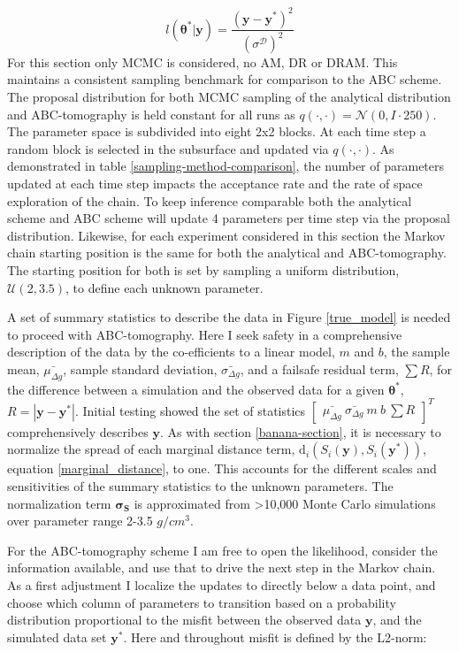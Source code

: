 \begin{equation}
	l(\bm{\theta^*}|\bm{y}) = \frac{(\bm{y}-\bm{y^*})^2}{(\sigma^{\mathcal{D}})^2}
\end{equation}
For this section only MCMC is considered, no AM, DR or DRAM. This maintains a consistent sampling benchmark for comparison to the ABC scheme. The proposal distribution for both MCMC sampling of the analytical distribution and ABC-tomography is held constant for all runs as $q(\cdot,\cdot) = \mathcal{N}(0,I\cdot250)$. The parameter space is subdivided into eight 2x2 blocks. At each time step a random block is selected in the subsurface and updated via $q(\cdot,\cdot)$. As demonstrated in table \ref{sampling-method-comparison}, the number of parameters updated at each time step impacts the acceptance rate and the rate of space exploration of the chain. To keep inference comparable both the analytical scheme and ABC scheme will update 4 parameters per time step via the proposal distribution. Likewise, for each experiment considered in this section the Markov chain starting position is the same for both the analytical and ABC-tomography. The starting position for both is set by sampling a uniform distribution, $\mathcal{U}(2,3.5)$, to define each unknown parameter. \par
A set of summary statistics to describe the data in Figure \ref{true_model} is needed to proceed with ABC-tomography. Here I seek safety in a comprehensive description of the data by the co-efficients to a linear model, $m$ and $b$, the sample mean, $\bar{\mu_{\Delta g}}$, sample standard deviation, $\bar{\sigma_{\Delta g}}$, and a failsafe residual term, $\sum R$, for the difference between a simulation and the observed data for a given $\bm{\theta^*}$, $R = |\bm{y}-\bm{y^*}|$. Initial testing showed the set of statistics $\begin{bmatrix}
\bar{\mu_{\Delta g}}\ \bar{\sigma_{\Delta g}}\ m\ b\ \sum R
\end{bmatrix}^T$ comprehensively describes $\bm{y}$. As with section \ref{banana-section}, it is necessary to normalize the spread of each marginal distance term, $\text{d}_i(S_i(\bm{y}),S_i(\bm{y^*}))$, equation \ref{marginal_distance}, to one. This accounts for the different scales and sensitivities of the summary statistics to the unknown parameters. The normalization term $\bm{\sigma_S}$ is approximated from >10,000 Monte Carlo simulations over parameter range 2-3.5 $g/cm^3$. \par
For the ABC-tomography scheme I am free to open the likelihood, consider the information available, and use that to drive the next step in the Markov chain. As a first adjustment I localize the updates to directly below a data point, and choose which column of parameters to transition based on a probability distribution proportional to the misfit between the observed data $\bm{y}$, and the simulated data set $\bm{y^*}$. Here and throughout misfit is defined by the L2-norm:
